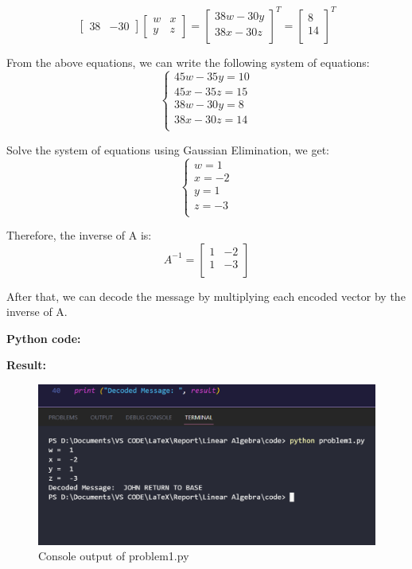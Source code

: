 \[
    \begin{bmatrix} 38 & -30 \end{bmatrix}
    \begin{bmatrix} w & x \\y & z \end{bmatrix}
    =
    \begin{bmatrix}
    38w -30y \\
    38x -30z \\
    \end{bmatrix}^T
    =
    \begin{bmatrix} 8 \\ 14 \\ \end{bmatrix}^T
\]

From the above equations, we can write the following system of equations:
\[
\begin{cases}
    45w -35y = 10 \\
    45x -35z = 15 \\
    38w -30y = 8 \\
    38x -30z = 14 \\
\end{cases}
\]

Solve the system of equations using Gaussian Elimination, we get:
\[
\begin{cases}
    w = 1 \\
    x = -2 \\
    y = 1 \\
    z = -3 \\
\end{cases}
\]

Therefore, the inverse of A is:
\[
    A^{-1} =
    \begin{bmatrix}
    1 & -2 \\
    1 & -3 \\
    \end{bmatrix}
\]

After that, we can decode the message by multiplying each encoded vector by the inverse of A.

\vspace*{1cm}

\textbf{Python code:}


\vspace*{0.5cm}

\textbf{Result:}
\begin{figure}[H]
    \centering
    \includegraphics[width=16cm]{graphics/1.png}
    \caption{Console output of problem1.py}
\end{figure}